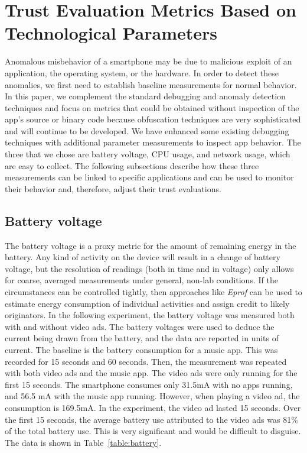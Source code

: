 \section{Trust Evaluation Metrics Based on Technological Parameters}

Anomalous misbehavior of a smartphone may be due to malicious exploit 
of an application, the operating system, or the hardware. In order to 
detect these anomalies, we first need to establish baseline 
measurements for normal behavior. In this paper, we complement the 
standard debugging and anomaly detection techniques and focus on 
metrics that could be obtained without inspection of the app’s source 
or binary code because obfuscation techniques are very sophisticated 
and will continue to be developed.
We have enhanced some existing debugging techniques with additional parameter measurements to inspect app behavior.
The three that we chose are battery voltage, CPU usage, and network usage, which are easy to collect.
The following subsections describe how these three measurements can be linked to specific applications
and can be used to monitor their behavior and, therefore, adjust their trust evaluations.


\subsection{Battery voltage}
The battery voltage is a proxy metric for the amount of remaining 
energy in the battery. Any kind of activity on the device will result 
in a change of battery voltage, but the resolution of readings (both 
in time and in voltage) only allows for coarse, averaged measurements 
under general, non-lab conditions.
If the circumstances can be controlled tightly, then approaches like 
\textit{Eprof} \cite{pathak2012fine} can be used to estimate energy consumption 
of individual activities and assign credit to likely originators.  In the following experiment,
the battery voltage was measured both with and without video ads.  The battery voltages were used to
deduce the current being drawn from the battery, and the data are reported in
units of current.
The ​baseline is the battery consumption for a music app.
This was recorded for 15 seconds and 60 seconds.  Then, the measurement was repeated
with both video ads and the music app.  The video ads were only running for the first 15 seconds.
The smartphone consumes only 31.5mA with no apps running, and 56.5 mA with the music app
running.
However, when playing a video ad, the consumption is 169.5mA. 
In the experiment, the video ad lasted 15 seconds.
Over the first 15 seconds, the average battery use attributed to the video ads was 81\% of the total
battery use.  This is very significant and would be difficult to disguise.
The data is shown in Table~\ref{table:battery}.



